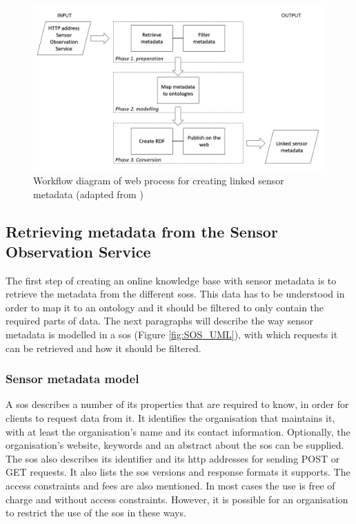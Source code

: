 \begin{figure}
	\centering
	\includegraphics[width=1\linewidth]{UML/wps1workflow.PNG}
	\caption{Workflow diagram of web process for creating linked sensor metadata (adapted from \cite{LD:Missier})}
	\label{fig:WPS1workflow}
\end{figure}

\subsection{Retrieving metadata from the Sensor Observation Service}
\label{chap:retrieveSOS}

The first step of creating an online knowledge base with sensor metadata is to retrieve the metadata from the different \aclp{sos}. This data has to be understood in order to map it to an ontology and it should be filtered to only contain the required parts of data. The next paragraphs will describe the way sensor metadata is modelled in a \ac{sos} (Figure \ref{fig:SOS_UML}), with which requests it can be retrieved and how it should be filtered. 

\subsubsection{Sensor metadata model}
A \ac{sos} describes a number of its properties that are required to know, in order for clients to request data from it. It identifies the organisation that maintains it, with at least the organisation's name and its contact information. Optionally, the organisation's website, keywords and an abstract about the \ac{sos} can be supplied. The \ac{sos} also describes its identifier and its \ac{http} addresses for sending POST or GET requests. It also lists the \ac{sos} versions and response formats it supports. The access constraints and fees are also mentioned. In most cases the use is free of charge and without access constraints. However, it is possible for an organisation to restrict the use of the \ac{sos} in these ways.  

